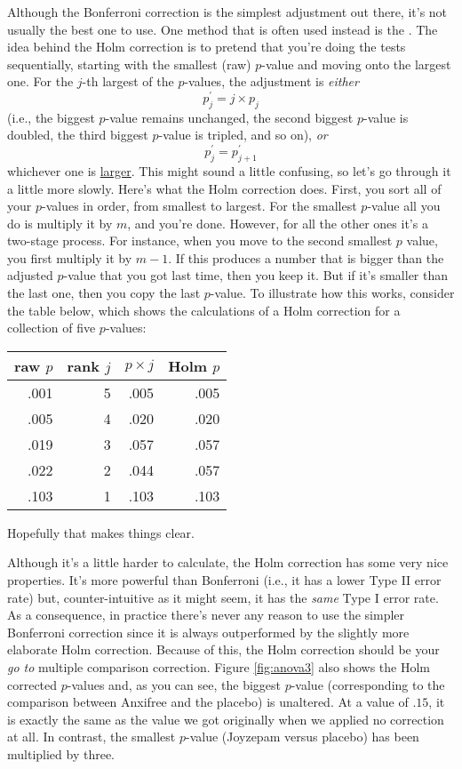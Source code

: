 Although the Bonferroni correction is the simplest adjustment out there, it's not usually the best one to use. One method that is often used instead is the  \parencite{Holm1979}. The idea behind the Holm correction is to pretend that you're doing the tests sequentially, starting with the smallest (raw) $p$-value and moving onto the largest one. For the $j$-th largest of the $p$-values, the adjustment is {\it either}
$$
p^\prime_j = j \times p_j 
$$
(i.e., the biggest $p$-value remains unchanged, the second biggest $p$-value is doubled, the third biggest $p$-value is tripled, and so on), {\it or}
$$
p^\prime_j = p^\prime_{j+1}
$$
whichever one is \underline{larger}. This might sound a little confusing, so let's go through it a little more slowly. Here's what the Holm correction does. First, you sort all of your $p$-values in order, from smallest to largest. For the smallest $p$-value all you do is multiply it by $m$, and you're done. However, for all the other ones it's a two-stage process. For instance, when you move to the second smallest $p$ value, you first multiply it by $m-1$. If this produces a number that is bigger than the adjusted $p$-value that you got last time, then you keep it. But if it's smaller than the last one, then you copy the last $p$-value. To illustrate how this works, consider the table below, which shows the calculations of a Holm correction for a collection of five $p$-values:
\begin{center}
\begin{tabular}{rrrr} 
 raw $p$ & rank $j$ & $p \times j$ & Holm $p$   \\ \hline
.001 & 5 & .005 & .005 \\
.005 & 4 & .020 & .020 \\
.019 & 3 & .057 & .057 \\
.022 & 2 & .044 & .057 \\
.103 & 1 & .103 & .103 \\
\end{tabular}
\end{center}
Hopefully that makes things clear. 

Although it's a little harder to calculate, the Holm correction has some very nice properties. It's more powerful than Bonferroni (i.e., it has a lower Type II error rate) but, counter-intuitive as it might seem, it has the {\it same} Type I error rate. As a consequence, in practice there's never any reason to use the simpler Bonferroni correction since it is always outperformed by the slightly more elaborate Holm correction. Because of this, the Holm correction should be your {\it go to} multiple comparison correction. Figure \ref{fig:anova3} also shows the Holm corrected $p$-values and, as you can see, the biggest $p$-value (corresponding to the comparison between Anxifree and the placebo) is unaltered. At a value of $.15$, it is exactly the same as the value we got originally when we applied no correction at all. In contrast, the smallest $p$-value (Joyzepam versus placebo) has been multiplied by three. 

